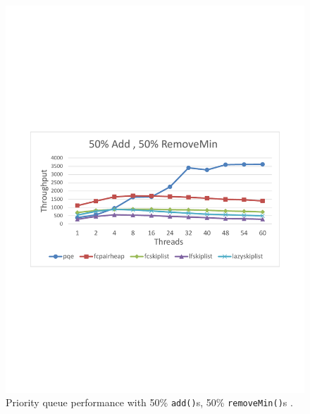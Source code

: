 \begin{figure}[htb]
	\centering
	\begin{minipage}[b]{.495\textwidth}
		\centering
		\includegraphics[width=\linewidth]{graphics/sparc-50-50.pdf}
		\caption{Priority queue performance with 50\% \texttt{add()}s, 50\% \texttt{removeMin()}s \cite{calciu_adaptive_2014}.}
		\label{fig:sparc_50}
	\end{minipage}
	\hfill%
	\begin{minipage}[b]{.495\textwidth}
		\centering

\end{minipage}
\end{figure}
